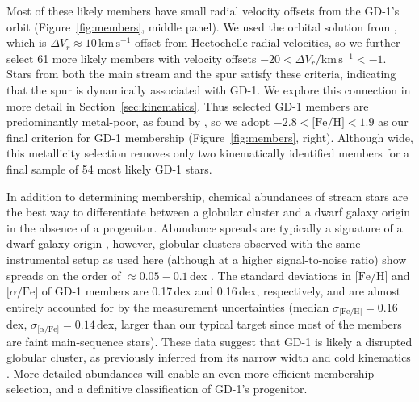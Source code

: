 \documentclass[twocolumn]{aastex63}
\newcommand{\kms}{\ensuremath{\textrm{km}\,\textrm{s}^{-1}}}
\newcommand{\feh}{\ensuremath{\textrm{[Fe/H]}}}
\newcommand{\afe}{\ensuremath{\textrm{[$\alpha$/Fe]}}}
\begin{document}
Most of these likely members have small radial velocity offsets from the GD-1's orbit (Figure~\ref{fig:members}, middle panel).
We used the orbital solution from \citet{pwb}, which is $\Delta V_r\approx10\,\kms$ offset from Hectochelle radial velocities, so we further select 61 more likely members with velocity offsets $-20 < \Delta V_r / \kms < -1$.
Stars from both the main stream and the spur satisfy these criteria, indicating that the spur is dynamically associated with GD-1.
We explore this connection in more detail in Section~\ref{sec:kinematics}.
% 
Thus selected GD-1 members are predominantly metal-poor, as found by \citet{malhan2019}, so we adopt $-2.8<\feh<1.9$ as our final criterion for GD-1 membership (Figure~\ref{fig:members}, right).
Although wide, this metallicity selection removes only two kinematically identified members for a final sample of 54 most likely GD-1 stars.

In addition to determining membership, chemical abundances of stream stars are the best way to differentiate between a globular cluster and a dwarf galaxy origin in the absence of a progenitor.
Abundance spreads are typically a signature of a dwarf galaxy origin \citep[e.g.,][]{willman2012}, however, globular clusters observed with the same instrumental setup as used here (although at a higher signal-to-noise ratio) show spreads on the order of $\approx0.05-0.1$\,dex \citep{cargile2019}.
The standard deviations in $\feh$ and $\afe$ of GD-1 members are 0.17\,dex and 0.16\,dex, respectively, and are almost entirely accounted for by the measurement uncertainties (median $\sigma_\feh=0.16$\,dex, $\sigma_\afe=0.14$\,dex, larger than our typical target since most of the members are faint main-sequence stars).
These data suggest that GD-1 is likely a disrupted globular cluster, as previously inferred from its narrow width \citep[e.g.,][]{grillmair2006} and cold kinematics \citep[e.g.,][]{malhan2019}.
More detailed abundances will enable an even more efficient membership selection, and a definitive classification of GD-1's progenitor.





\end{document}
